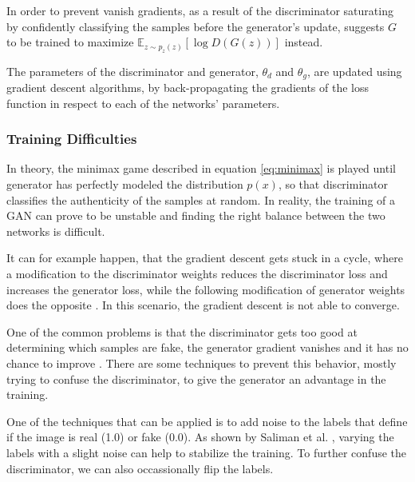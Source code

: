 \documentclass{article}
\begin{document}
In order to prevent vanish gradients, as a result of the discriminator saturating by confidently classifying the samples before the generator's update, \cite{goodfellow_generative_2014} suggests $G$ to be trained to maximize $\mathbb{E}_{z \sim p_{z}(z)}[\log D(G(z))]$ instead.

The parameters of the discriminator and generator, $\theta_{d}$ and $\theta_{g}$, are updated using gradient descent algorithms, by back-propagating the gradients of the loss function in respect to each of the networks' parameters. 


\subsubsection{Training Difficulties}



In theory, the minimax game described in equation \ref{eq:minimax} is played until generator has perfectly modeled the distribution $p(x)$, so that discriminator classifies the authenticity of the samples at random. In reality, the training of a GAN can prove to be unstable and finding the right balance between the two networks is difficult.

It can for example happen, that the gradient descent gets stuck in a cycle, where a modification to the discriminator weights reduces the discriminator loss and increases the generator loss, while the following modification of generator weights does the opposite \cite{salimans_improved_2016}. In this scenario, the gradient descent is not able to converge.

One of the common problems is that the discriminator gets too good at determining which samples are fake, the generator gradient vanishes and it has no chance to improve \cite{arjovsky_towards_2017}. There are some techniques to prevent this behavior, mostly trying to confuse the discriminator, to give the generator an advantage in the training.

One of the techniques that can be applied is to add noise to the labels that define if the image is real (1.0) or fake (0.0). As shown by Saliman et al. \cite{salimans_improved_2016}, varying the labels with a slight noise can help to stabilize the training. To further confuse the discriminator, we can also occassionally flip the labels. 


\end{document}
